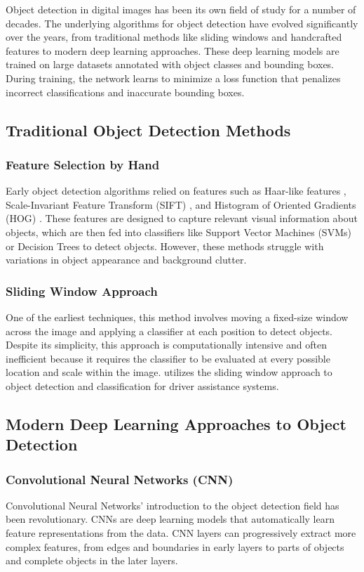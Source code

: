 Object detection in digital images has been its own field of study for a number of decades. The underlying algorithms for object detection have evolved significantly over the years, from traditional methods like sliding windows and handcrafted features to modern deep learning approaches. These deep learning models are trained on large datasets annotated with object classes and bounding boxes. During training, the network learns to minimize a loss function that penalizes incorrect classifications and inaccurate bounding boxes.

\subsection{Traditional Object Detection Methods}
\subsubsection*{Feature Selection by Hand}
Early object detection algorithms relied on features such as Haar-like features \citep{objdet_simplefeatures}, Scale-Invariant Feature Transform (SIFT) \citep{objdet_sift}, and Histogram of Oriented Gradients (HOG) \citep{objdet_hog}. These features are designed to capture relevant visual information about objects, which are then fed into classifiers like Support Vector Machines (SVMs) \citep{svm} or Decision Trees \citep{decisiontrees} to detect objects. However, these methods struggle with variations in object appearance and background clutter.

\subsubsection*{Sliding Window Approach}
One of the earliest techniques, this method involves moving a fixed-size window across the image and applying a classifier at each position to detect objects. Despite its simplicity, this approach is computationally intensive and often inefficient because it requires the classifier to be evaluated at every possible location and scale within the image. \cite{objdet_slidingwindow} utilizes the sliding window approach to object detection and classification for driver assistance systems.

\subsection{Modern Deep Learning Approaches to Object Detection}


\subsubsection{Convolutional Neural Networks (CNN)}
Convolutional Neural Networks' introduction to the object detection field has been revolutionary. CNNs are deep learning models that automatically learn feature representations from the data. CNN layers can progressively extract more complex features, from edges and boundaries in early layers to parts of objects and complete objects in the later layers.


